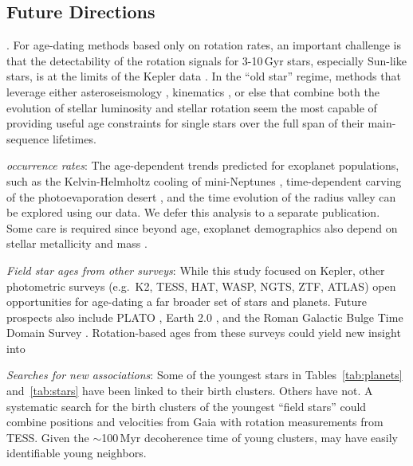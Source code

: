 \documentclass[11pt,twocolumn,tighten]{aastex63}
\begin{document}
\subsection{Future Directions}

. For
age-dating methods based only on rotation rates, an important challenge
is that the detectability of the rotation signals for 3-10\,Gyr stars,
especially Sun-like stars, is at the limits of the Kepler data
\citep{2022ApJ...937...94M}.  In the ``old star'' regime, methods that
leverage either asteroseismology
\citep{vanSaders_2016,2024ApJ...962..138S}, kinematics \citep{2021AJ....161..189L,See2024},
or else that combine both
the evolution of stellar luminosity and stellar rotation
\citep{Angus_2019,Claytor2020,2023ApJ...952..131M} seem the most
capable of providing useful age constraints for single stars over the
full span of their main-sequence lifetimes.

{\it {} occurrence rates}:
The age-dependent trends predicted for exoplanet populations, such as
the Kelvin-Helmholtz cooling of mini-Neptunes \citep{Gupta_2019},
time-dependent carving of the photoevaporation desert
\citep{Owen2018}, and the time evolution of the radius valley
\citep{Rogers_2021} can be explored using our data.  We defer this
analysis to a separate publication.  Some care is required since
beyond age, exoplanet demographics also depend on stellar metallicity
and mass \citep[e.g.][]{Petigura_2018,Miyazaki2023}.  

{\it Field star ages from other surveys}:
While this study focused on Kepler, other photometric surveys
(e.g.~K2, TESS, HAT, WASP, NGTS, ZTF, ATLAS) open opportunities for
age-dating a far broader set of stars and planets.  Future prospects
also include PLATO \citep{Rauer14}, Earth 2.0
\citep{2022arXiv220606693G}, and the Roman Galactic Bulge Time Domain
Survey \citep{Wilson2023}.  Rotation-based ages from these surveys could
yield new insight
into 

{\it Searches for new associations}:
Some of the youngest stars in Tables~\ref{tab:planets}
and~\ref{tab:stars} have been linked to their birth clusters.
Others have not. A systematic search for the birth clusters of the
youngest ``field stars'' could combine positions and velocities from
Gaia with rotation measurements from TESS. Given the $\sim$100\,Myr
decoherence time of young clusters,  may
have easily identifiable young neighbors.
\end{document}

